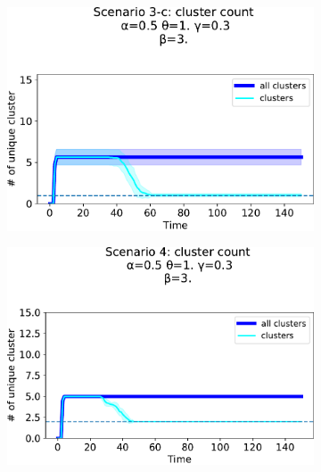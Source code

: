 \begin{figure}[t]
\begin{subfigure}[b]{0.32\textwidth}
    \includegraphics[width=\textwidth]{papers/swarm-intelligence2021/img/simulations/one-direction_0_021_α-0.5_θ-1._γ-0.3_β-3._ω-0._ζ-0..pdf}
  \end{subfigure}
  \hfill
  \centering
  \begin{subfigure}[b]{0.32\textwidth}
    \centering
    \includegraphics[width=\textwidth]{papers/swarm-intelligence2021/img/simulations/overlay_0_021_α-0.5_θ-1._γ-0.3_β-3._ω-0._ζ-0..pdf}
  \end{subfigure}
  \hfill
  \centering
  \begin{subfigure}[b]{0.32\textwidth}
    \centering

\end{subfigure}
\end{figure}
